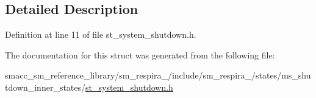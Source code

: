 \subsection{Detailed Description}


Definition at line 11 of file st\+\_\+system\+\_\+shutdown.\+h.



The documentation for this struct was generated from the following file\+:\begin{DoxyCompactItemize}
\item 
smacc\+\_\+sm\+\_\+reference\+\_\+library/sm\+\_\+respira\+\_/include/sm\+\_\+respira\+\_/states/ms\+\_\+shutdown\+\_\+inner\+\_\+states/\hyperlink{st__system__shutdown_8h}{st\+\_\+system\+\_\+shutdown.\+h}\end{DoxyCompactItemize}
